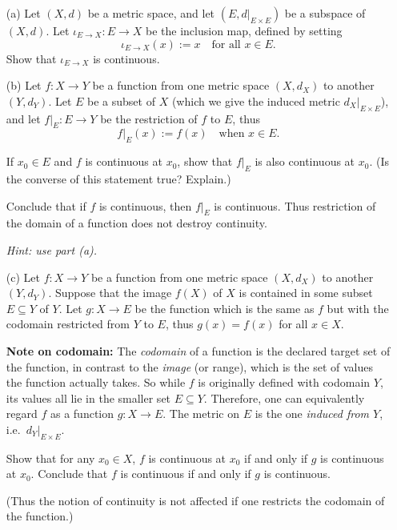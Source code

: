 \begin{problem}[24pts]
  \vphantom{text}
  \begin{enumerate}

  \item[(a)] 
Let $(X,d)$ be a metric space, and let $(E,d|_{E \times E})$ be a subspace of $(X,d)$.  
Let $\iota_{E \to X} : E \to X$ be the inclusion map, defined by setting 
\[
\iota_{E \to X}(x) := x \quad \text{for all } x \in E.
\]  
Show that $\iota_{E \to X}$ is continuous.

 \item[(b)] Let $f : X \to Y$ be a function from one metric space $(X,d_X)$ to another $(Y,d_Y)$.  
Let $E$ be a subset of $X$ (which we give the induced metric $d_X|_{E \times E}$), and let $f|_E : E \to Y$ be the restriction of $f$ to $E$, thus
\[
f|_E(x) := f(x) \quad \text{when } x \in E.
\]  

If $x_0 \in E$ and $f$ is continuous at $x_0$, show that $f|_E$ is also continuous at $x_0$.  
(Is the converse of this statement true? Explain.)  

Conclude that if $f$ is continuous, then $f|_E$ is continuous.  
Thus restriction of the domain of a function does not destroy continuity.  

\emph{Hint: use part (a).}
 
 \item[(c)] 
Let $f : X \to Y$ be a function from one metric space $(X,d_X)$ to another $(Y,d_Y)$.  
Suppose that the image $f(X)$ of $X$ is contained in some subset $E \subseteq Y$ of $Y$.  
Let $g : X \to E$ be the function which is the same as $f$ but with the codomain restricted from $Y$ to $E$, thus $g(x) = f(x)$ for all $x \in X$.  

\medskip
\textbf{Note on codomain:}  
The \emph{codomain} of a function is the declared target set of the function, in contrast to the \emph{image} (or range), which is the set of values the function actually takes.  
So while $f$ is originally defined with codomain $Y$, its values all lie in the smaller set $E \subseteq Y$.  
Therefore, one can equivalently regard $f$ as a function $g : X \to E$.  
The metric on $E$ is the one \emph{induced from $Y$}, i.e.\ $d_Y|_{E \times E}$.

\medskip
Show that for any $x_0 \in X$, $f$ is continuous at $x_0$ if and only if $g$ is continuous at $x_0$.  
Conclude that $f$ is continuous if and only if $g$ is continuous.  

(Thus the notion of continuity is not affected if one restricts the codomain of the function.)

\end{enumerate}
\end{problem}
